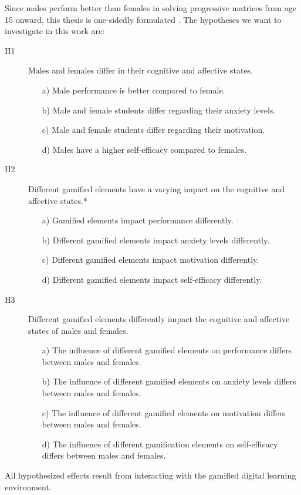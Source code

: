 Since males perform better than females in solving progressive matrices from age 15 onward, this thesis is one-sidedly formulated \parencite{ravenStandardProgressiveMatrices2003}.
The hypotheses we want to investigate in this work are:
\begin{description}
    \item[H1] Males and females differ in their cognitive and affective states.
    \begin{itemize}
        \item[a)] Male performance is better compared to female.
        \item[b)] Male and female students differ regarding their anxiety levels.
        \item[c)] Male and female students differ regarding their motivation.
        \item[d)] Males have a higher self-efficacy compared to females.
    \end{itemize}
    \item[H2] Different gamified elements have a varying impact on the cognitive and affective states.*
    \begin{itemize}
        \item[a)] Gamified elements impact performance differently.
        \item[b)] Different gamified elements impact anxiety levels differently.
        \item[c)] Different gamified elements impact motivation differently.
        \item[d)] Different gamified elements impact self-efficacy differently.
    \end{itemize}
    \item[H3] Different gamified elements differently impact the cognitive and affective states of males and females.
    \begin{itemize}
        \item[a)] The influence of different gamified elements on performance differs between males and females.
        \item[b)] The influence of different gamified elements on anxiety levels differs between males and females.
        \item[c)] The influence of different gamified elements on motivation differs between males and females.
        \item[d)] The influence of different gamification elements on self-efficacy differs between males and females.
    \end{itemize}
\end{description}
All hypothesized effects result from interacting with the gamified digital learning environment.
